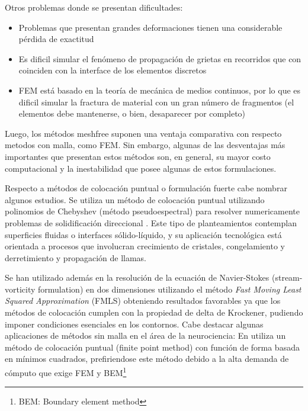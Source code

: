 Otros problemas donde se presentan dificultades:
\begin{itemize}
\item Problemas que presentan grandes deformaciones tienen una considerable pérdida de exactitud
\item Es dificil simular el fenómeno de propagación de grietas en recorridos que con coinciden con la interface de los elementos discretos
\item FEM está basado en la teoría de mecánica de medios continuos, por lo que es dificil simular la fractura de material con un gran número de fragmentos (el elementos debe mantenerse, o bien, desaparecer por completo)
\end{itemize}

Luego, los métodos meshfree suponen una ventaja comparativa con respecto metodos con malla, como FEM. Sin embargo, algunas de las desventajas más importantes que presentan estos métodos son, en general, su mayor costo computacional y la inestabilidad que posee algunas de estos formulaciones.



Respecto a métodos de colocación puntual o formulación fuerte cabe nombrar algunos estudios. Se utiliza un método de colocación puntual utilizando polinomios de Chebyshev (método pseudoespectral) para resolver numericamente problemas de solidificación direccional \cite{solidification}. Este tipo de planteamientos contemplan superficies fluidas o interfaces sólido-líquido, y su aplicación tecnológica está orientada a procesos que involucran crecimiento de cristales, congelamiento y derretimiento y propagación de llamas.

Se han utilizado además en la resolución de la ecuación de Navier-Stokes (stream-vorticity formulation) en dos dimensiones utilizando el método \textit{Fast Moving Least Squared Approximation} (FMLS) \cite{2D_NS_MF} obteniendo resultados favorables ya que los métodos de colocación cumplen con la propiedad de delta de Krockener, pudiendo imponer condiciones esenciales en los contornos. Cabe destacar algunas aplicaciones de métodos sin malla en el área de la neurociencia: En \cite{eeg} utiliza un método de colocación puntual (finite point method) con función de forma basada en mínimos cuadrados, prefiriendose este método debido a la alta demanda de cómputo que exige FEM y BEM\footnote{BEM: Boundary element method}

